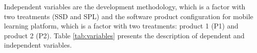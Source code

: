 Independent variables are the development methodology, which is a factor with two treatments (SSD and SPL) and the software product configuration for mobile learning platform, which is a factor with two treatments: product 1 (P1) and product 2 (P2). Table \ref{tab:variables} presents the description of dependent and independent variables.

\begin{landscape}
\centering
\begin{table}[h]
\caption{\label{tab:variables}Dependent and Independent Variables Description.}
\end{table}
\end{landscape}
